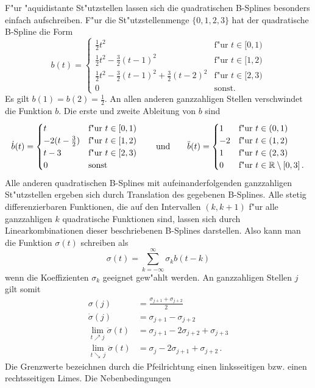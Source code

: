 \documentclass[a4paper]{scrartcl}
\newcommand{\R}{{\mathbb{R}}}
\begin{document}
F"ur "aquidistante St"utzstellen lassen sich die quadratischen B-Splines besonders einfach aufschreiben. F"ur die St"utzstellenmenge $\{0,1,2,3\}$ hat der quadratische B-Spline die Form
$$ b(t)=\begin{cases}
\frac12t^2 & \text{f"ur $t\in[0,1)$} \\
\frac12t^2-\frac32(t-1)^2 & \text{f"ur $t\in[1,2)$} \\
\frac12t^2-\frac32(t-1)^2+\frac32(t-2)^2 & \text{f"ur $t\in[2,3)$} \\
0 & \text{sonst.}
\end{cases} $$
Es gilt $b(1)=b(2)=\frac12$. An allen anderen ganzzahligen Stellen verschwindet  die Funktion $b$. Die erste und zweite Ableitung von $b$ sind
$$ \dot b(t)=\begin{cases}
t & \text{f"ur $t\in[0,1)$} \\
-2(t-\frac32) & \text{f"ur $t\in[1,2)$} \\
t-3 & \text{f"ur $t\in[2,3)$} \\
0 & \text{sonst}
\end{cases} 
\qquad \text{und} \qquad
\ddot b(t)=\begin{cases}
1 & \text{f"ur $t\in(0,1)$} \\
-2 & \text{f"ur $t\in(1,2)$} \\
1 & \text{f"ur $t\in(2,3)$} \\
0 & \text{f"ur $t\in\R\setminus[0,3]$\,.}
\end{cases} $$
Alle anderen quadratischen B-Splines mit aufeinanderfolgenden ganzzahligen St"utzstellen ergeben sich durch Translation des gegebenen B-Splines. Alle stetig differenzierbaren Funktionen, die auf den Intervallen $(k,k+1)$ f"ur alle ganzzahligen $k$ quadratische Funktionen sind, lassen sich durch Linearkombinationen dieser beschriebenen B-Splines darstellen. Also kann man die Funktion $\sigma(t)$ schreiben als
$$ \sigma(t) = \sum_{k=-\infty}^{\infty}\sigma_kb(t-k) $$
wenn die Koeffizienten $\sigma_k$ geeignet gew"ahlt werden. An ganzzahligen Stellen $j$ gilt somit
\begin{align*}
\sigma(j) &= \frac{\sigma_{j+1}+\sigma_{j+2}}{2} \\
\dot\sigma(j) &= \sigma_{j+1}-\sigma_{j+2} \\
\lim_{t\nearrow j}\ddot\sigma(t) &= \sigma_{j+1}-2\sigma_{j+2}+\sigma_{j+3} \\
\lim_{t\searrow\,j}\ddot\sigma(t) &= \sigma_{j}-2\sigma_{j+1}+\sigma_{j+2}\,.
\end{align*}
Die Grenzwerte bezeichnen durch die Pfeilrichtung einen linksseitigen bzw. einen rechtsseitigen Limes. Die Nebenbedingungen 
\end{document}
